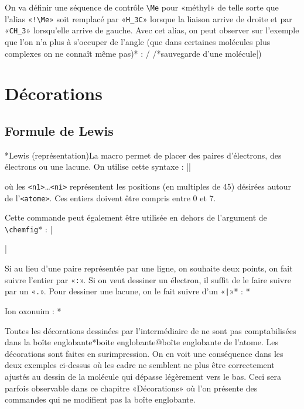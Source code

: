 \documentclass[10pt]{article}
\makeatletter
\newcommand\idx{\@ifstar{\let\print@or@not\@gobble\idx@}{\let\print@or@not\@firstofone\idx@}}
\newcommand\idx@[1]{%
	\ifcat\expandafter\noexpand\@car#1\@nil\relax%
		\expandafter\ifx\@car#1\@nil\protect
			\index{#1}%
			\print@or@not{#1}%
		\else
			\saveexpandmode\expandarg
			\StrSubstitute{\string#1}{\string @}{\@empty\protect\symbol{'100}}[\temp@]%
			\StrGobbleLeft\temp@1[\temp@]%
			\restoreexpandmode
			\expandafter\index\expandafter{\temp@ @\protect\texttt{\protect\textbackslash\temp@}}%
			\print@or@not{\texttt{\string#1}}%
		\fi
	\else
		\index{#1}%
		\print@or@not{#1}%
	\fi
}
\newcommand\make@car@active[1]{%
	\catcode`#1\active
	\begingroup
		\lccode`\~`#1\relax
		\lowercase{\endgroup\def~}%
}
\newif\if@exstar
\newcommand\exemple{%
	\begingroup
	\parskip\z@
	\@makeother\;\@makeother\!\@makeother\?\@makeother\:%
	\@ifstar{\@exstartrue\exemple@}{\@exstarfalse\exemple@}}
\newcommand\exemple@[2][65]{%
	\medbreak\noindent
	\begingroup
		\let\do\@makeother\dospecials
		\make@car@active\ { {}}%
		\make@car@active\^^M{\par\leavevmode}%
		\make@car@active\^^I{\space\space}%
		\make@car@active\,{\leavevmode\kern\z@\string,}%
		\make@car@active\-{\leavevmode\kern\z@\string-}%
		\make@car@active\>{\leavevmode\kern\z@\string>}%
		\make@car@active\<{\leavevmode\kern\z@\string<}%
		\exemple@@{#1}{#2}%
}
\newcommand\exemple@@[3]{%
	\def\@tempa##1#3{\exemple@@@{#1}{#2}{##1}}%
	\@tempa
}
\newcommand\exemple@@@[3]{%
	\xdef\the@code{#3}%
	\endgroup
	\if@exstar
		\begingroup
			\fboxrule0.4pt
			\let\breakboxparindent\z@
			\def\bkvz@bottom{\hrule\@height\fboxrule}%
			\let\bkvz@before@breakbox\relax
			\def\bkvz@set@linewidth{\advance\linewidth\dimexpr-2\fboxrule-2\fboxsep}%
			\def\bkvz@left{\vrule\@width\fboxrule\hskip\fboxsep}%
			\def\bkvz@right{\hskip\fboxsep\vrule\@width\fboxrule}%
			\def\bkvz@top{\hbox to \hsize{%
				\vrule\@width\fboxrule\@height\fboxrule
				\leaders\bkvz@bottom\hfill
				\ECFAugie
				\fboxsep\z@
				\colorbox{black}{\kern0.25em\color{white}\footnotesize\lower0.5ex\hbox{\strut#2}\kern0.25em}%
				\leaders\bkvz@bottom\hfill
				\vrule\@width\fboxrule\@height\fboxrule}}%
			\breakbox
				\kern.5ex\relax
				\ttfamily\footnotesize\the@code\par
				\normalfont
				\kern3pt
				\hrule height0.1pt width\linewidth depth0.1pt
				\vskip5pt
				\rightskip0pt plus 1fill
				\everypar{{\color{lightgray}\rlap{\vrule height0.1pt width\linewidth depth0.1pt}}\hskip0pt plus 1fill}%
				\newlinechar`\^^M\everyeof{\noexpand}\scantokens{#3}\par
			\endbreakbox
		\endgroup
	\else
		\vskip0.5ex
		\boxput*(0,1)
			{\fboxsep\z@
			\hbox{\ECFAugie\colorbox{black}{\leavevmode\kern0.25em{\color{white}\footnotesize\strut#2}\kern0.25em}}%
			}%
			{\fboxsep5pt
			\fbox{%
				$\vcenter{\hsize\dimexpr0.#1\linewidth-\fboxsep-\fboxrule\relax
					\kern5pt\parskip0pt \ttfamily\footnotesize\the@code}%
				\vcenter{\kern5pt\hsize\dimexpr\linewidth-0.#1\linewidth-\fboxsep-\fboxrule\relax
					\everypar{{\color{lightgray}\rlap{\vrule height0.1pt width\dimexpr\linewidth-0.#1\linewidth-\fboxsep-\fboxrule depth0.1pt}}}%
					\footnotesize\newlinechar`\^^M\everyeof{\noexpand}\scantokens{#3}}$%
				}%
			}%
	\fi
	\medbreak
	\endgroup
}
\let\do\@makeother\dospecials
\makeatother
\begin{document}
On va définir une séquence de contrôle \verb-\Me- pour «méthyl» de telle sorte que l'alias «\verb-!\Me-» soit remplacé par «\verb-H_3C-» lorsque la liaison arrive de droite et par «\verb-CH_3-» lorsqu'elle arrive de gauche. Avec cet alias, on peut observer sur l'exemple que l'on n'a plus à s'occuper de l'angle (que dans certaines molécules plus complexes on ne connaît même pas)\idx*{} :
\exemple{Alias dual}/
/\idx*{sauvegarde d'une molécule|)}

\section{Décorations}
\subsection{Formule de Lewis}\label{lewis}
\idx*{Lewis (représentation)}La macro \idx{\lewis} permet de placer des paires d'électrons, des électrons ou une lacune. On utilise cette syntaxe :
\centerverb||
\smallskip

où les \verb-<n1>-\ldots\verb-<ni>- représentent les positions (en multiples de 45\degres) désirées autour de l'\verb-<atome>-. Ces entiers doivent être compris entre 0 et 7.

Cette commande peut également être utilisée en dehors de l'argument de \verb-\chemfig-\idx*{\lewis} :
\exemple{La macro \string\lewis}|\par\medskip
{}\par\medskip
{}|

Si au lieu d'une paire représentée par une ligne, on souhaite deux points, on fait suivre l'entier par «\verb-:-». Si on veut dessiner un électron, il suffit de le faire suivre par un «\verb-.-». Pour dessiner une lacune, on le fait suivre d'un «\verb-|-»\idx*{\lewis} :
\exemple{Décorations de Lewis}*\qquad{}\par\bigskip
{}\qquad{}\par\bigskip
{}\par\bigskip
Ion oxonuim : *

Toutes les décorations dessinées par l'intermédiaire de \idx{\lewis} ne sont pas comptabilisées dans la boîte englobante\idx*{boite englobante@boîte englobante} de l'atome. Les décorations sont faites en surimpression. On en voit une conséquence dans les deux exemples ci-dessus où les cadre ne semblent ne plus être correctement ajustés au dessin de la molécule qui dépasse légèrement vers le bas. Ceci sera parfois observable dans ce chapitre «Décorations» où l'on présente des commandes qui ne modifient pas la boîte englobante.
\end{document}
